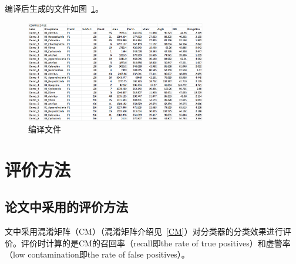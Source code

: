 \documentclass[12pt]{article}
\begin{document}
编译后生成的文件如图~\ref{fig: CompilationFile}。

\begin{figure}[!ht]
\centering
\includegraphics[width=0.7\textwidth]{CompilationFile}
\caption{编译文件}
\label{fig: CompilationFile}
\end{figure}




\section{评价方法}

\subsection{论文中采用的评价方法}
文中采用{\color{blue}混淆矩阵（CM）}（混淆矩阵介绍见~\ref{CM}）对分类器的分类效果进行评价。评价时计算的是CM的召回率（recall即the rate of true positives）和虚警率（low contamination即the rate of false positives）。
\end{document}
